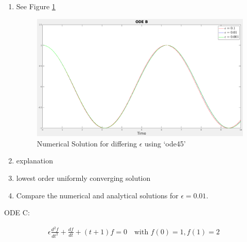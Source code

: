 \documentclass{article}
\begin{document}
\begin{enumerate}[label=\alph*.]
    \item See Figure \ref{fig:ODEB_num_sol}
        \begin{figure}[ht]
            \centering
            \includegraphics[width=\textwidth]{images/ODEB.png}
            \caption{Numerical Solution for differing $\epsilon$ using `ode45'}
            \label{fig:ODEB_num_sol}
        \end{figure}

    \item explanation
    \item lowest order uniformly converging solution
    \item Compare the numerical and analytical solutions for $\epsilon = 0.01$. 
\end{enumerate}

\vspace{20pt}

ODE C: 

\begin{gather*}
    \epsilon\frac{d^2f}{dt^2} + \frac{df}{dt} + (t+1)f = 0 \quad
    \text{with } f(0) = 1, f(1) = 2
\end{gather*}
\end{document}

